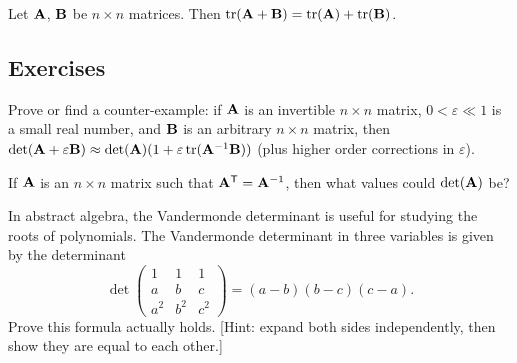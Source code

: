 \begin{proposition}
Let $\mathbf{A}$, $\mathbf{B}$ be $n\times n$ matrices.
Then $\mathop{\rm tr}\nolimits(\mathbf{A} + \mathbf{B}) = \mathop{\rm tr}\nolimits(\mathbf{A}) + \mathop{\rm tr}\nolimits(\mathbf{B})$.
\end{proposition}


\subsection*{Exercises}

\begin{exercise}
Prove or find a counter-example: if $\mathbf{A}$ is an invertible $n\times n$
matrix, $0<\varepsilon\ll1$ is a small real number, and $\mathbf{B}$ is an
arbitrary $n\times n$ matrix, then
$\det(\mathbf{A} + \varepsilon\mathbf{B})\approx \det(\mathbf{A})(1 + \varepsilon\mathop{\rm tr}\nolimits(\mathbf{A}^{-1}\mathbf{B}))$
(plus higher order corrections in $\varepsilon$).
\end{exercise}

\begin{exercise}
If $\mathbf{A}$ is an $n\times n$ matrix such that $\mathbf{A}^{\mathsf{T}}=\mathbf{A}^{-1}$,
then what values could $\det(\mathbf{A})$ be?
\end{exercise}

\begin{exercise}
In abstract algebra, the Vandermonde determinant is useful for studying
the roots of polynomials. The Vandermonde determinant in three variables
is given by the determinant
\[ \det\begin{pmatrix}
1     & 1     & 1 \\
a     & b     & c\\
a^{2} & b^{2} & c^{2}
\end{pmatrix}=(a-b)(b-c)(c-a). \]
Prove this formula actually holds. [Hint: expand both sides
  independently, then show they are equal to each other.]
\end{exercise}
